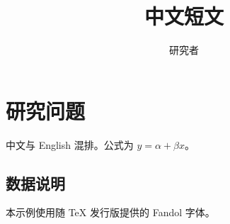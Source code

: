 \documentclass[UTF8,fontset=fandol,zihao=-4,oneside]{ctexart}
\begin{document}
\title{中文短文}\author{研究者}\date{}\maketitle
\tableofcontents\section{研究问题}中文与 English 混排。公式为 $y=\alpha+\beta x$。
\subsection{数据说明}本示例使用随 TeX 发行版提供的 Fandol 字体。
\end{document}
